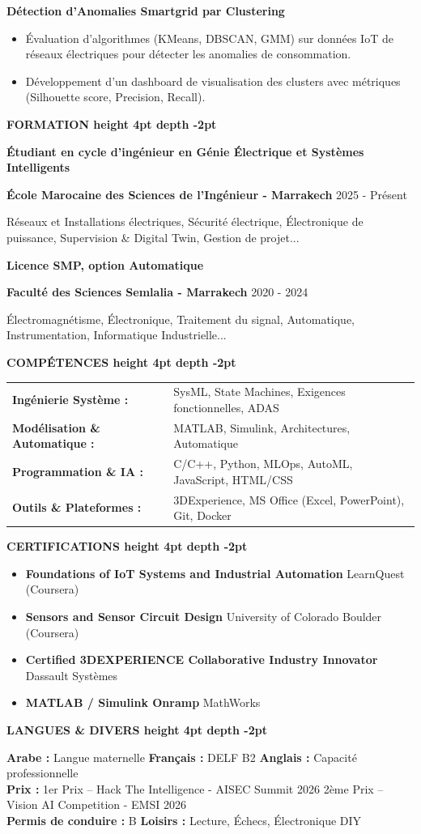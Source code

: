 \documentclass[10pt,a4paper]{../../altacv}
\renewcommand{\cvsection}[2][]{%
  \medskip%
  {\color{heading}\LARGE\bfseries #2 \hspace{0.2em}\leaders\vrule height 4pt depth -2pt\hfill\mbox{}}\par\smallskip
}
\renewcommand{\cvevent}[4]{%
  {\large\bfseries\color{accent}#1\par}
  \smallskip\normalsize
  \ifstrequal{#2}{}{}{%
    \textbf{\color{emphasis}#2\ifstrequal{#4}{}{}{ - #4}}%
  }%
  \hfill
  \ifstrequal{#3}{}{}{{\small#3}}%
  \par\smallskip
}
\begin{document}
{\large\bfseries\color{accent} Détection d'Anomalies Smartgrid par Clustering}\\[0.05cm]
\begin{itemize}
  \item Évaluation d'algorithmes (KMeans, DBSCAN, GMM) sur données IoT de réseaux électriques pour détecter les anomalies de consommation.
  \item Développement d'un dashboard de visualisation des clusters avec métriques (Silhouette score, Precision, Recall).
\end{itemize}

\cvsection{FORMATION}
\cvevent{Étudiant en cycle d'ingénieur en Génie Électrique et Systèmes Intelligents}{École Marocaine des Sciences de l'Ingénieur}{2025 - Présent}{Marrakech}
\small Réseaux et Installations électriques, Sécurité électrique, Électronique de puissance, Supervision \& Digital Twin, Gestion de projet...

\cvevent{Licence SMP, option Automatique}{Faculté des Sciences Semlalia}{2020 - 2024}{Marrakech}
\small Électromagnétisme, Électronique, Traitement du signal, Automatique, Instrumentation, Informatique Industrielle...

\cvsection{COMPÉTENCES}
\begin{tabular}{@{}ll@{}}
\textbf{Ingénierie Système :} & SysML, State Machines, Exigences fonctionnelles, ADAS \\[1pt]
\textbf{Modélisation \& Automatique :} & MATLAB, Simulink, Architectures, Automatique \\[1pt]
\textbf{Programmation \& IA :} & C/C++, Python, MLOps, AutoML, JavaScript, HTML/CSS \\[1pt]
\textbf{Outils \& Plateformes :} & 3DExperience, MS Office (Excel, PowerPoint), Git, Docker \\
\end{tabular}

\cvsection{CERTIFICATIONS}
\begin{itemize}[leftmargin=*, label=\textbullet, itemsep=2pt]
  \item \textbf{Foundations of IoT Systems and Industrial Automation} \hfill {\color{emphasis}LearnQuest (Coursera)}
  \item \textbf{Sensors and Sensor Circuit Design} \hfill {\color{emphasis}University of Colorado Boulder (Coursera)}
  \item \textbf{Certified 3DEXPERIENCE Collaborative Industry Innovator} \hfill {\color{emphasis}Dassault Systèmes}
  \item \textbf{MATLAB / Simulink Onramp} \hfill {\color{emphasis}MathWorks}
\end{itemize}

\cvsection{LANGUES \& DIVERS}
\textbf{Arabe :} Langue maternelle \hfill \textbf{Français :} DELF B2 \hfill \textbf{Anglais :} Capacité professionnelle\\[2pt]
\textbf{Prix :} 1er Prix -- Hack The Intelligence - AISEC Summit 2026 \hfill 2ème Prix -- Vision AI Competition - EMSI 2026\\[2pt]
\textbf{Permis de conduire :} B \hfill \textbf{Loisirs :} Lecture, Échecs, Électronique DIY
\end{document}
